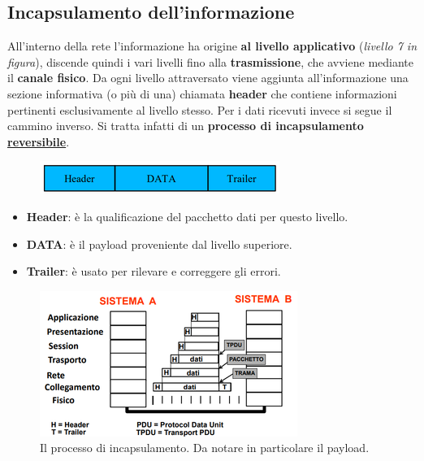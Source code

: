 \documentclass[11pt,a4paper]{article}
\theoremstyle{definition}
\begin{document}
\subsection{Incapsulamento dell'informazione}
All'interno della rete l'informazione ha origine \textbf{al livello
	applicativo} (\textit{livello 7 in figura}), discende quindi i vari livelli fino alla
\textbf{trasmissione}, che avviene mediante il \textbf{canale fisico}.
Da ogni livello attraversato viene aggiunta all'informazione una sezione informativa (o più di una) chiamata \textbf{header} che contiene informazioni pertinenti esclusivamente al livello stesso.
Per i dati ricevuti invece si segue il cammino inverso. Si tratta infatti di un \textbf{processo di incapsulamento \underline{reversibile}}.
\begin{figure}[!h]
	\includegraphics[scale=0.5]{Immagini/Incapsulamento.png}
	\centering
\end{figure}
\begin{itemize}
	\item \textbf{Header}: è la qualificazione del pacchetto dati per questo livello.
	\item \textbf{DATA}: è il payload proveniente dal livello superiore.
	\item \textbf{Trailer}: è usato per rilevare e correggere gli errori.
\end{itemize}

\begin{figure}[!h]
	\includegraphics[scale=0.7]{Immagini/Incaps_2.png}
	\centering
	\caption{Il processo di incapsulamento. Da notare in particolare il payload.}
\end{figure}
\newpage
\end{document}
